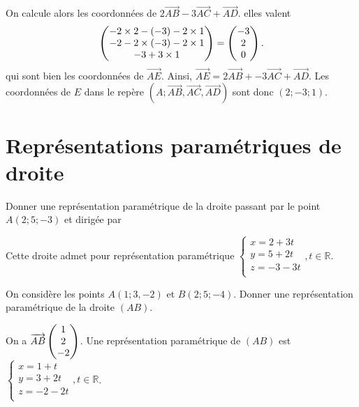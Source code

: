 \documentclass[11pt,fleqn, openany]{book} %
\begin{document}
\begin{solution}
On calcule alors les coordonnées de $2 \overrightarrow{AB}-3 \overrightarrow{AC}+\overrightarrow{AD}$. elles valent
\[\coordbe{-2 \times 2-(-3)-2 \times 1}{-2-2\times (-3)-2 \times 1}{-3+3\times 1}=\coordbe{-3}{2}{0}.\]
qui sont bien les coordonnées de $\overrightarrow{AE}$. Ainsi, $\overrightarrow{AE}= 2\overrightarrow{AB}+-3 \overrightarrow{AC}+ \overrightarrow{AD}$. Les coordonnées de $E$ dans le repère  $(A;\overrightarrow{AB},\overrightarrow{AC},\overrightarrow{AD})$ sont donc $(2;-3;1)$.\end{solution}




\section*{Représentations paramétriques de droite}

\begin{exercise}
Donner une représentation paramétrique de la droite passant par le point $A(2;5;-3)$ et dirigée par \renewcommand{\arraystretch}{1}
\end{exercise}
\begin{solution}Cette droite admet pour représentation paramétrique\renewcommand{\arraystretch}{1} \(\left\{ \begin{array}{l}x=2+3t \\ y=5+2t \\ z = -3-3t \\\end{array}\right., t \in \mathbb{R}\).\end{solution}


\begin{exercise}On considère les points $A(1;3,-2)$ et $B(2;5;-4)$. Donner une représentation paramétrique de la droite $(AB)$.\end{exercise}
\begin{solution}On a \(\overrightarrow{AB} \renewcommand{\arraystretch}{1}\begin{pmatrix}1\\2\\-2\end{pmatrix}\). Une représentation paramétrique de \((AB)\) est\renewcommand{\arraystretch}{1} \(\left\{ \begin{array}{l}x=1+t \\ y=3+2t\\ z = -2-2t \\\end{array}\right., t \in \mathbb{R}\).\end{solution}
\end{document}
